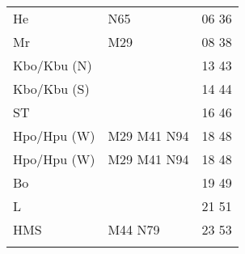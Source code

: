 \begin{tabular}{!{\color{schiefergrau}\vrule width 3pt}*{3}{l!{\color{schiefergrau}\vrule width 3pt}}}
He           & \nbus{} N65                                                & 06 36 \\
Mr           & \mbus{} M29                                                & 08 38 \\
Kbo/Kbu (N)  & \nueins{}                                                  & 13 43 \\
Kbo/Kbu (S)  & \nueins{}                                                  & 14 44 \\
ST           &                                                            & 16 46 \\
Hpo/Hpu (W)  & \nusieben{} \mbus{} M29 M41 \nbus{} N94                    & 18 48 \\
\hline
Hpo/Hpu (W)  & \nusieben{} \mbus{} M29 M41 \nbus{} N94                    & 18 48 \\
Bo           &                                                            & 19 49 \\
L            &                                                            & 21 51 \\
HMS          & \mbus{} M44 \nbus{} N79                                    & 23 53 \\
\myhline
\end{tabular}
%
